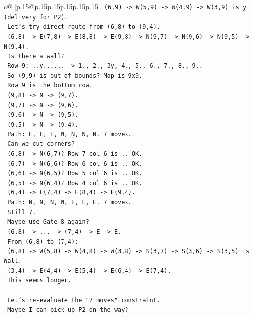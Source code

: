 \documentclass{article}
\begin{document}
{\begin{supertabular}{c@{$\;$}|p{.15\linewidth}@{}p{.15\linewidth}p{.15\linewidth}p{.15\linewidth}p{.15\linewidth}p{.15\linewidth}}
{{{\texttt{    (6,9) {-}> W(5,9) {-}> W(4,9) {-}> W(3,9) is y (delivery for P2).} \\
\texttt{    Let's try direct route from (6,8) to (9,4).} \\
\texttt{    (6,8) {-}> E(7,8) {-}> E(8,8) {-}> E(9,8) {-}> N(9,7) {-}> N(9,6) {-}> N(9,5) {-}> N(9,4).} \\
\texttt{    Is there a wall?} \\
\texttt{    Row 9: ..y...... {-}> 1., 2., 3y, 4., 5., 6., 7., 8., 9..} \\
\texttt{    So (9,9) is out of bounds? Map is 9x9.} \\
\texttt{    Row 9 is the bottom row.} \\
\texttt{    (9,8) {-}> N {-}> (9,7).} \\
\texttt{    (9,7) {-}> N {-}> (9,6).} \\
\texttt{    (9,6) {-}> N {-}> (9,5).} \\
\texttt{    (9,5) {-}> N {-}> (9,4).} \\
\texttt{    Path: E, E, E, N, N, N, N. 7 moves.} \\
\texttt{    Can we cut corners?} \\
\texttt{    (6,8) {-}> N(6,7)? Row 7 col 6 is .. OK.} \\
\texttt{    (6,7) {-}> N(6,6)? Row 6 col 6 is .. OK.} \\
\texttt{    (6,6) {-}> N(6,5)? Row 5 col 6 is .. OK.} \\
\texttt{    (6,5) {-}> N(6,4)? Row 4 col 6 is .. OK.} \\
\texttt{    (6,4) {-}> E(7,4) {-}> E(8,4) {-}> E(9,4).} \\
\texttt{    Path: N, N, N, N, E, E, E. 7 moves.} \\
\texttt{    Still 7.} \\
\texttt{    Maybe use Gate B again?} \\
\texttt{    (6,8) {-}> ... {-}> (7,4) {-}> E {-}> E.} \\
\texttt{    From (6,8) to (7,4):} \\
\texttt{    (6,8) {-}> W(5,8) {-}> W(4,8) {-}> W(3,8) {-}> S(3,7) {-}> S(3,6) {-}> S(3,5) is Wall.} \\
\texttt{    (3,4) {-}> E(4,4) {-}> E(5,4) {-}> E(6,4) {-}> E(7,4).} \\
\texttt{    This seems longer.} \\
\\ 
\texttt{    Let's re{-}evaluate the "7 moves" constraint.} \\
\texttt{    Maybe I can pick up P2 on the way?} \\
}}}
\end{supertabular}}
\end{document}

